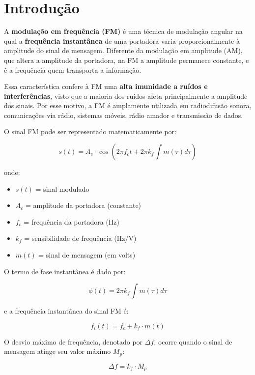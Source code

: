 \section{Introdução}

A \textbf{modulação em frequência (FM)} é uma técnica de modulação angular na qual a \textbf{frequência instantânea} de uma portadora varia proporcionalmente à amplitude do sinal de mensagem. Diferente da modulação em amplitude (AM), que altera a amplitude da portadora, na FM a amplitude permanece constante, e é a frequência quem transporta a informação.

Essa característica confere à FM uma \textbf{alta imunidade a ruídos e interferências}, visto que a maioria dos ruídos afeta principalmente a amplitude dos sinais. Por esse motivo, a FM é amplamente utilizada em radiodifusão sonora, comunicações via rádio, sistemas móveis, rádio amador e transmissão de dados.

O sinal FM pode ser representado matematicamente por:

\begin{equation}
s(t) = A_c \cdot \cos \left( 2\pi f_c t + 2\pi k_f \int m(\tau) d\tau \right)
\end{equation}

onde:  
\begin{itemize}
    \item $s(t)$ = sinal modulado
    \item $A_c$ = amplitude da portadora (constante)
    \item $f_c$ = frequência da portadora (Hz)
    \item $k_f$ = sensibilidade de frequência (Hz/V)
    \item $m(t)$ = sinal de mensagem (em volts)
\end{itemize}

O termo de fase instantânea é dado por:

\begin{equation}
\phi(t) = 2\pi k_f \int m(\tau) d\tau
\end{equation}

e a frequência instantânea do sinal FM é:

\begin{equation}
f_i(t) = f_c + k_f \cdot m(t)
\end{equation}

O desvio máximo de frequência, denotado por $\Delta f$, ocorre quando o sinal de mensagem atinge seu valor máximo $M_p$:

\begin{equation}
\Delta f = k_f \cdot M_p
\end{equation}

